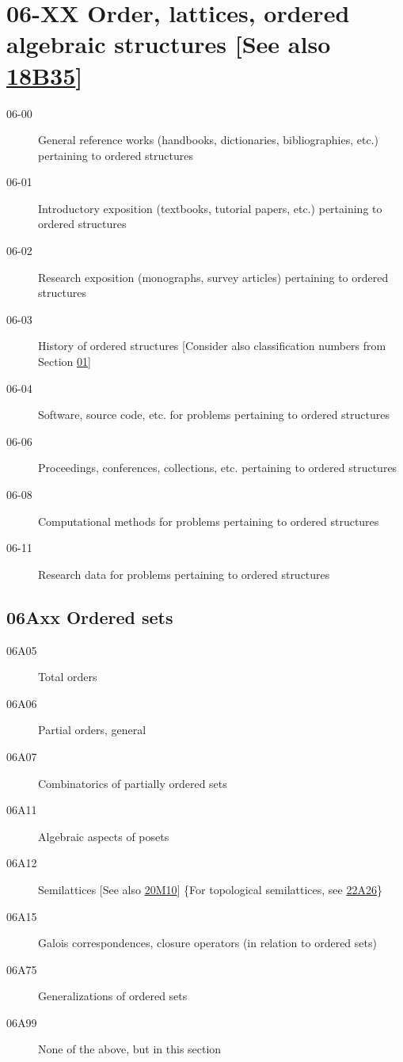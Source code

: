 \section*{06-XX Order, lattices, ordered algebraic structures [See also \hyperref[18B35]{18B35}] }\label{06-XX}
\begin{description}
\item [06-00]\label{06-00} General reference works (handbooks, dictionaries, bibliographies, etc.) pertaining to ordered structures
\item [06-01]\label{06-01} Introductory exposition (textbooks, tutorial papers, etc.) pertaining to ordered structures
\item [06-02]\label{06-02} Research exposition (monographs, survey articles) pertaining to ordered structures
\item [06-03]\label{06-03} History of ordered structures [Consider also classification numbers from Section \hyperref[01-XX]{01}]
\item [06-04]\label{06-04} Software, source code, etc. for problems pertaining to ordered structures
\item [06-06]\label{06-06} Proceedings, conferences, collections, etc. pertaining to ordered structures
\item [06-08]\label{06-08} Computational methods for problems pertaining to ordered structures
\item [06-11]\label{06-11} Research data for problems pertaining to ordered structures
\end{description}
\subsection*{06Axx  Ordered sets }\label{06Axx}
\begin{description}  
\item [06A05]\label{06A05} Total orders
\item [06A06]\label{06A06} Partial orders, general
\item [06A07]\label{06A07} Combinatorics of partially ordered sets
\item [06A11]\label{06A11} Algebraic aspects of posets
\item [06A12]\label{06A12} Semilattices [See also \hyperref[20M10]{20M10}] \{For topological semilattices, see \hyperref[22A26]{22A26}\}
\item [06A15]\label{06A15} Galois correspondences, closure operators (in relation to ordered sets)
\item [06A75]\label{06A75} Generalizations of ordered sets
\item [06A99]\label{06A99} None of the above, but in this section
\end{description}
